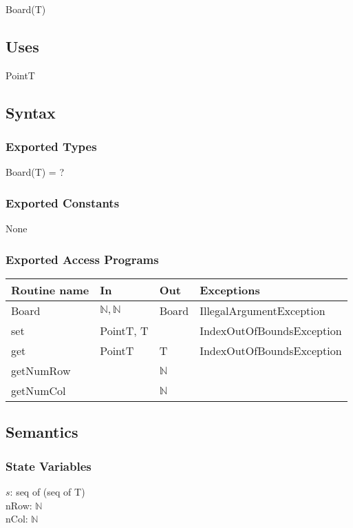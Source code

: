 \documentclass[12pt]{article}
\begin{document}
Board(T)

\subsection* {Uses}

PointT

\subsection* {Syntax}

\subsubsection* {Exported Types}

Board(T) = ?

\subsubsection* {Exported Constants}

None

\subsubsection* {Exported Access Programs}

\begin{tabular}{| l | l | l | p{6cm} |}
\hline
\textbf{Routine name} & \textbf{In} & \textbf{Out} & \textbf{Exceptions}\\
\hline
Board & $\mathbb{N},\mathbb{N}$ & Board & IllegalArgumentException\\
\hline
set & PointT, T & ~ & IndexOutOfBoundsException\\
\hline
get & PointT & T & IndexOutOfBoundsException\\
\hline
getNumRow & ~ & $\mathbb{N}$ & \\
\hline
getNumCol & ~ & $\mathbb{N}$ & \\
\hline
\end{tabular}

\subsection* {Semantics}

\subsubsection* {State Variables}

$s$: seq of (seq of T)\\
nRow: $\mathbb{N}$\\
nCol: $\mathbb{N}$
\end{document}
